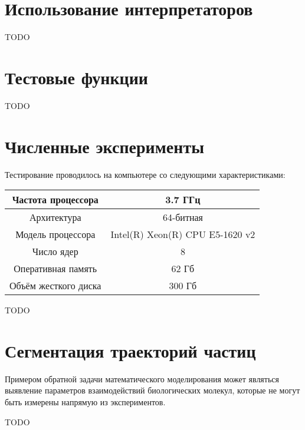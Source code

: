 \section*{Использование интерпретаторов}
TODO

\section*{Тестовые функции}
TODO

\section*{Численные эксперименты}

Тестирование проводилось на компьютере со следующими характеристиками:

\begin{tabular}{| c | c |}
    \hline
    Частота процессора & 3.7 ГГц \\ \hline
    Архитектура & 64-битная \\ \hline
    Модель процессора & Intel(R) Xeon(R) CPU E5-1620 v2 \\ \hline
    Число ядер & 8 \\ \hline
    Оперативная память & 62 Гб \\ \hline
    Объём жесткого диска & 300 Гб \\
    \hline
\end{tabular}

TODO

\section*{Сегментация траекторий частиц}

Примером обратной задачи математического моделирования
может являться выявление параметров взаимодействий биологических молекул,
которые не могут быть измерены напрямую из экспериментов.

TODO
